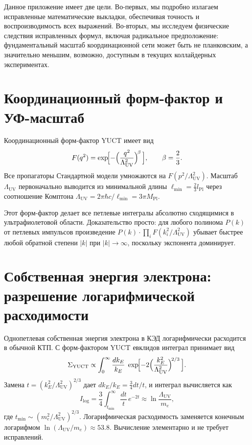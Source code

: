 \documentclass[11pt,a4paper]{article}
\newcommand{\Mpl}{M_{\mathrm{Pl}}}
\newcommand{\Lpl}{l_{\mathrm{Pl}}}
\newcommand{\Lmin}{\ell_{\min}}
\newcommand{\LUV}{\Lambda_{\mathrm{UV}}}
\theoremstyle{remark}
\begin{document}
	Данное приложение имеет две цели. Во-первых, мы подробно излагаем исправленные математические выкладки, обеспечивая точность и воспроизводимость всех выражений. Во-вторых, мы исследуем физические следствия исправленных формул, включая радикальное предположение: фундаментальный масштаб координационной сети может быть не планковским, а значительно меньшим, возможно, доступным в текущих коллайдерных экспериментах.
	
	\section{Координационный форм-фактор и УФ-масштаб}
	\label{sec:formfactor}
	
	Координационный форм-фактор YUCT имеет вид
	\begin{equation}
		F(q^2) = \exp\!\Bigl[-\Bigl(\frac{q^2}{\LUV^2}\Bigr)^{\!\beta}\,\Bigr], \qquad \beta = \frac{2}{3}.
		\label{eq:F}
	\end{equation}
	Все пропагаторы Стандартной модели умножаются на \(F(p^2/\LUV^2)\). Масштаб \(\LUV\) первоначально выводится из минимальной длины \(\Lmin = \frac{2}{3}\Lpl\) через соотношение Комптона \(\LUV = 2\pi\hbar c/\Lmin = 3\pi\Mpl\).
	
	Этот форм-фактор делает все петлевые интегралы абсолютно сходящимися в ультрафиолетовой области. Доказательство просто: для любого полинома \(P(k)\) от петлевых импульсов произведение \(P(k) \cdot \prod_i F(k_i^2/\LUV^2)\) убывает быстрее любой обратной степени \(|k|\) при \(|k| \to \infty\), поскольку экспонента доминирует.
	
	\section{Собственная энергия электрона: разрешение логарифмической расходимости}
	\label{sec:electron}
	
	Однопетлевая собственная энергия электрона в КЭД логарифмически расходится в обычной КТП. С форм-фактором YUCT евклидов интеграл принимает вид
	\begin{equation}
		\Sigma_{\mathrm{YUCT}} \propto \int_0^{\infty} \frac{dk_E}{k_E}\; \exp\!\Bigl[-2\Bigl(\frac{k_E^2}{\LUV^2}\Bigr)^{\!2/3}\,\Bigr].
		\label{eq:elec_int}
	\end{equation}
	Замена \(t = (k_E^2/\LUV^2)^{2/3}\) дает \(dk_E/k_E = \frac{3}{4} dt/t\), и интеграл вычисляется как
	\begin{equation}
		I_{\mathrm{log}} = \frac{3}{4} \int_{t_{\min}}^{\infty} \frac{dt}{t}\, e^{-2t} \approx \ln\frac{\LUV}{m_e},
		\label{eq:elec_result}
	\end{equation}
	где \(t_{\min} \sim (m_e^2/\LUV^2)^{2/3}\). Логарифмическая расходимость заменяется конечным логарифмом \(\ln(\LUV/m_e) \approx 53.8\). Вычисление элементарно и не требует исправлений.
	
\end{document}
